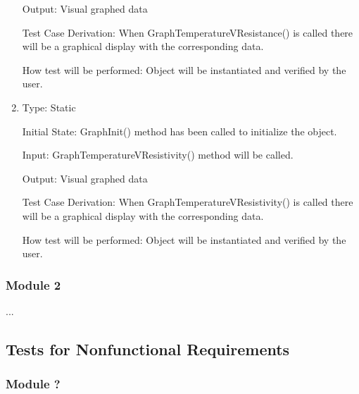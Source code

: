 \documentclass[12pt, titlepage]{article}
\begin{document}
\begin{enumerate}[{UT-GO}1.]
Output: Visual graphed data

Test Case Derivation: When GraphTemperatureVResistance() is called there will be a graphical display with the corresponding data.

How test will be performed: Object will be instantiated and verified by the user.

\item

Type: Static
					
Initial State: GraphInit() method has been called to initialize the object.
					
Input: GraphTemperatureVResistivity() method will be called.
					
Output: Visual graphed data

Test Case Derivation: When GraphTemperatureVResistivity() is called there will be a graphical display with the corresponding data.

How test will be performed: Object will be instantiated and verified by the user.
\end{enumerate}
\subsubsection{Module 2}

...

\subsection{Tests for Nonfunctional Requirements}



\subsubsection{Module ?}
		
\end{document}
